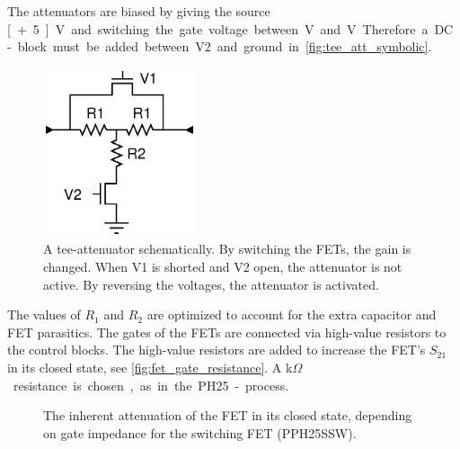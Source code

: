 		The attenuators are  biased by giving the source \unit[+5]{V} and switching  the gate voltage between \unit[3]{V} and \unit[5]{V}. Therefore a DC-block must be added between V2 and ground in \autoref{fig:tee_att_symbolic}. 
		
		\begin{figure}[h!]
			\centering
			\includegraphics[width=0.4\textwidth]{fig/attenuators/tee-attenuator-variable-symbolic}
			\caption[A tee-attenuator schematically]{A tee-attenuator schematically. By switching the FETs, the gain is changed. When V1 is shorted and V2 open, the attenuator is not active. By reversing the voltages, the attenuator is activated.}\label{fig:tee_att_symbolic}
		\end{figure}



		The values of $R_1$ and $R_2$ are optimized to account for the extra capacitor and FET parasitics. The gates of the FETs are connected via high-value resistors to the control blocks. The high-value resistors are added to increase the FET's $S_{21}$ in its closed state, see \autoref{fig:fet_gate_resistance}. A \unit[6]{k$\Omega$} resistance is chosen, as in the PH25-process. 

		

		\begin{figure}[h!]
			\centering
			\caption[Drain-source conductance depending on gate impedance.]{The inherent attenuation of the FET in its closed state, depending on gate impedance for the switching FET  (PPH25SSW).}\label{fig:fet_gate_resistance}
		\end{figure}		
		

